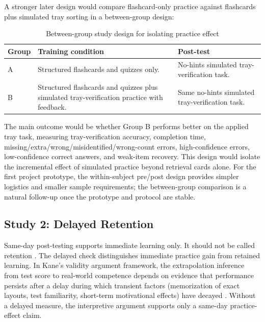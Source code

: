 \documentclass[10pt,a4paper]{article}
\begin{document}
A stronger later design would compare flashcard-only practice against
flashcards plus simulated tray sorting in a between-group design:
\begin{table}[H]
\centering
\caption{Between-group study design for isolating practice effect}
\label{tab:between-group-study-design-for-isolating-practice-effect}
\small\renewcommand{\arraystretch}{1.2}\setlength{\tabcolsep}{4pt}
\begin{tabularx}{\textwidth}{|>{\raggedright\arraybackslash}X|>{\raggedright\arraybackslash}X|>{\raggedright\arraybackslash}X|}
\hline
Group & Training condition & Post-test \\
\hline
A & Structured flashcards and quizzes only. & No-hints simulated tray-verification task. \\
\hline
B & Structured flashcards and quizzes plus simulated tray-verification practice with feedback. & Same no-hints simulated tray-verification task. \\
\hline
\end{tabularx}
\end{table}
The main outcome would be whether Group B performs better on the applied tray
task, measuring tray-verification accuracy, completion time,
missing/extra/wrong/misidentified/wrong-count errors, high-confidence errors,
low-confidence correct answers, and weak-item recovery. This design would
isolate the incremental effect of simulated practice beyond retrieval cards
alone. For the first project prototype, the within-subject pre/post design provides
simpler logistics and smaller sample requirements; the between-group comparison
is a natural follow-up once the prototype and protocol are stable.
\subsection{Study 2: Delayed Retention}
\label{sec:study-2}

Same-day post-testing supports immediate learning only. It should not be called
retention \cite{bell-et-al-2008}. The delayed check distinguishes immediate
practice gain from retained learning. In Kane's validity argument framework, the
extrapolation inference from test score to real-world competence depends on
evidence that performance persists after a delay during which transient factors
(memorization of exact layouts, test familiarity, short-term motivational
effects) have decayed \cite{kane-validity-2013}. Without a delayed measure, the
interpretive argument supports only a same-day practice-effect claim.
\end{document}

